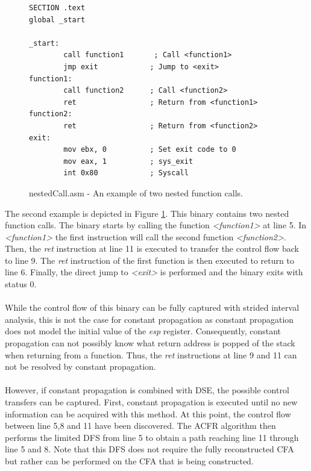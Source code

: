 \documentclass{kththesis}
\renewcommand{\it}[1]{\textit{#1}}
\begin{document}
\begin{figure}[!t]
    \centering
\begin{tcolorbox}
\begin{verbatim}
SECTION .text
global _start

_start:
        call function1       ; Call <function1>
        jmp exit            ; Jump to <exit>
function1:
        call function2      ; Call <function2>
        ret                 ; Return from <function1>
function2:
        ret                 ; Return from <function2>
exit:
        mov ebx, 0          ; Set exit code to 0
        mov eax, 1          ; sys_exit
        int 0x80            ; Syscall
\end{verbatim}
\end{tcolorbox}
\caption{nestedCall.asm - An example of two nested function calls.}
    \label{fig:nestedCall.asm}
\end{figure}
\clearpage
\noindent
The second example is depicted in Figure \ref{fig:nestedCall.asm}. This binary contains two nested function calls. The binary starts by calling the function \it{<function1>} at line 5. In \it{<function1>} the first instruction will call the second function \it{<function2>}. Then, the \it{ret} instruction at line 11 is executed to transfer the control flow back to line 9. The \it{ret} instruction of the first function is then executed to return to line 6. Finally, the direct jump to \it{<exit>} is performed and the binary exits with status $0$.
\\ \\
While the control flow of this binary can be fully captured with strided interval analysis, this is not the case for constant propagation as constant propagation does not model the initial value of the \it{esp} register. Consequently, constant propagation can not possibly know what return address is popped of the stack when returning from a function. Thus, the \it{ret} instructions at line 9 and 11 can not be resolved by constant propagation. 
\\ \\
However, if constant propagation is combined with DSE, the possible control transfers can be captured. First, constant propagation is executed until no new information can be acquired with this method. At this point, the control flow between line 5,8 and 11 have been discovered. The ACFR algorithm then performs the limited DFS from line 5 to obtain a path reaching line 11 through line 5 and 8. Note that this DFS does not require the fully reconstructed CFA but rather can be performed on the CFA that is being constructed.
\end{document}
